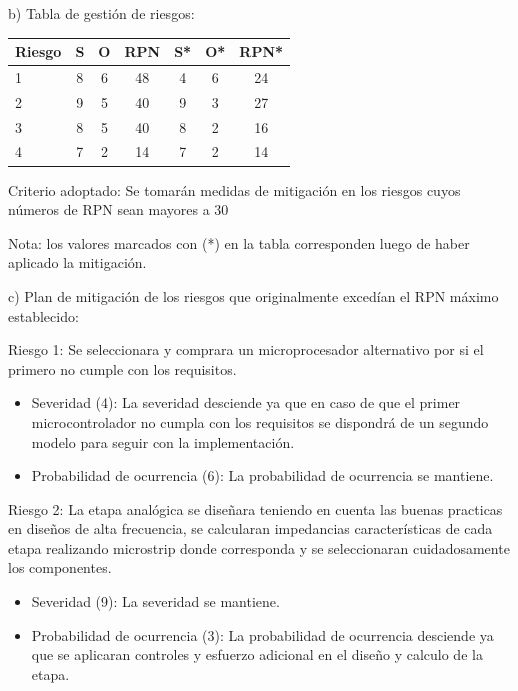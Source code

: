 \documentclass[11pt]{charter}
\begin{document}
b) Tabla de gestión de riesgos:

\begin{table}[htpb]
\centering
\begin{tabularx}{\linewidth}{@{}|X|c|c|c|c|c|c|@{}}
\hline
\rowcolor[HTML]{C0C0C0} 
Riesgo & S & O & RPN & S* & O* & RPN* \\ \hline
1      & 8  & 6  & \cellcolor[HTML]{EA6B66}48  & 4   & 6  & 24     \\ \hline
2      & 9  & 5  & \cellcolor[HTML]{EA6B66}40  & 9   & 3  & 27     \\ \hline
3      & 8  & 5  & \cellcolor[HTML]{EA6B66}40  & 8   & 2  & 16     \\ \hline
4      & 7  & 2  & 14  & 7   & 2  & 14     \\ \hline
\end{tabularx}%
\end{table}

Criterio adoptado: 
Se tomarán medidas de mitigación en los riesgos cuyos números de RPN sean mayores a 30

Nota: los valores marcados con (*) en la tabla corresponden luego de haber aplicado la mitigación.

c) Plan de mitigación de los riesgos que originalmente excedían el RPN máximo establecido:
 
Riesgo 1: Se seleccionara y comprara un microprocesador alternativo por si el primero no cumple con los requisitos.
\begin{itemize}  
\item Severidad (4): La severidad desciende ya que en caso de que el primer microcontrolador no cumpla con los requisitos se dispondrá de un segundo modelo para seguir con la implementación. 
\item Probabilidad de ocurrencia (6): La probabilidad de ocurrencia se mantiene.
\end{itemize}

Riesgo 2: La etapa analógica se diseñara teniendo en cuenta las buenas practicas en diseños de alta frecuencia, se calcularan impedancias características de cada etapa realizando microstrip donde corresponda y se seleccionaran cuidadosamente los componentes.
\begin{itemize}  
\item Severidad (9): La severidad se mantiene.
\item Probabilidad de ocurrencia (3): La probabilidad de ocurrencia desciende ya que se aplicaran controles y esfuerzo adicional en el diseño y calculo de la etapa.
\end{itemize}
   
\end{document}
